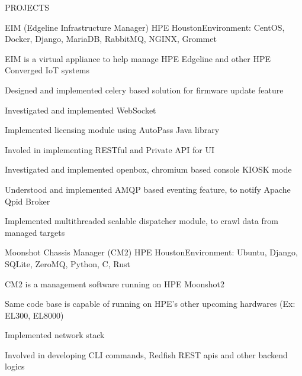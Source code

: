 \documentclass{resume} %
\begin{document}





\begin{rSection}{PROJECTS}


\begin{rSubsection}{EIM (Edgeline Infrastructure Manager)}
{HPE Houston}{Environment: CentOS, Docker, Django,  MariaDB, RabbitMQ, NGINX, Grommet}{ }  %

\vspace{-3pt}

\item EIM is a virtual appliance to help manage HPE Edgeline and other HPE Converged IoT systems
\item Designed and implemented celery based solution for firmware update feature
\item Investigated and implemented WebSocket
\item Implemented licensing module using AutoPass Java library
\item Involed in implementing RESTful and Private API for UI
\item Investigated and implemented openbox, chromium based console KIOSK mode
\item Understood and implemented AMQP based eventing feature, to notify Apache Qpid Broker
\item Implemented multithreaded scalable dispatcher module, to crawl data from managed targets

\end{rSubsection}


\begin{rSubsection}{Moonshot Chassis Manager (CM2)}
{HPE Houston}{Environment: Ubuntu, Django,  SQLite, ZeroMQ, Python, C, Rust}{ }  %

\vspace{-3pt}

\item CM2 is a management software running on HPE Moonshot2
\item Same code base is capable of running on HPE's other upcoming hardwares (Ex: EL300, EL8000)
\item Implemented network stack
\item Involved in developing CLI commands, Redfish REST apis and other backend logics



\end{rSubsection}
\end{rSection}
\end{document}
